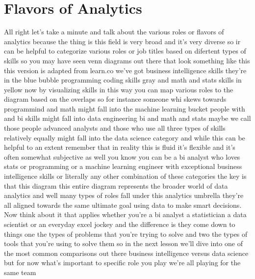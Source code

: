 \section{Flavors of Analytics}

All right let's take a minute and talk about the various roles or flavors of analytics because the thing is this field
is very broad and it's very diverse so ir can be helpful to categorize various roles or job titles
based on difertent types of skills so you may have seen venn diagrams out there that look something like this
this version is adapted from learn.co we've got business intelligence skills they're in the blue bubble programming coding skills gray and math  and stats skills in yellow now by
visualizing skills in this way you can map various roles to the diagram based on the overlaps so for instance someone
whi skews towards programmind and math might fall into the machine learning bucket people with and bi skills might fall into data engineering
bi and math and stats maybe we call those people advanced analysts and those who use all three types of skills
relatively equally might fall into the data science category and while this can be helpful to an extent remember that in reality this is fluid
it's flexible and it's often somewhat subjective as well you know you can be a bi analyst who loves stats or programming or a machine
learning engineer with exceptional business intelligence skills or literally any other combination of these categories the key is that this diagram this entire
diagram represents the broader world of data analytics and well many types of roles fall under this analytics umbrella they're
all aligned towards the same ultimate goal using data to make smart decisions. Now think about it that applies whether you're a bi analyst
a statistician a data scientist or an everyday excel jockey and the difference is they come down to things one the types of problems that you're trying to solve
and two the types of tools that you're  using to solve them so in the next lesson we'll dive into one of the most common comparisons out 
there business intelligence versus data  science but for now what's important to specific role you play we're all playing 
for the same team 